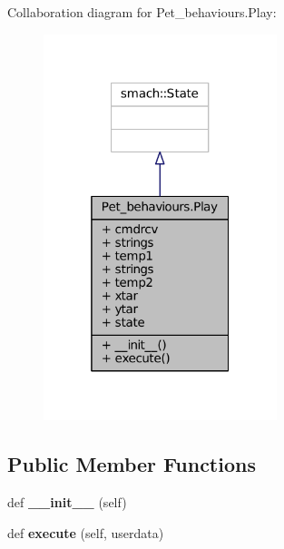 Collaboration diagram for Pet\+\_\+behaviours.\+Play\+:\nopagebreak
\begin{figure}[H]
\begin{center}
\leavevmode
\includegraphics[width=193pt]{classPet__behaviours_1_1Play__coll__graph}
\end{center}
\end{figure}
\subsection*{Public Member Functions}
\begin{DoxyCompactItemize}
\item 
def {\bfseries \+\_\+\+\_\+init\+\_\+\+\_\+} (self)\hypertarget{classPet__behaviours_1_1Play_abaa16a6b254a58dfa47da4c3cca55b20}{}\label{classPet__behaviours_1_1Play_abaa16a6b254a58dfa47da4c3cca55b20}

\item 
def {\bfseries execute} (self, userdata)\hypertarget{classPet__behaviours_1_1Play_a03948eb0dd2c9595f88741a11199271a}{}\label{classPet__behaviours_1_1Play_a03948eb0dd2c9595f88741a11199271a}

\end{DoxyCompactItemize}
